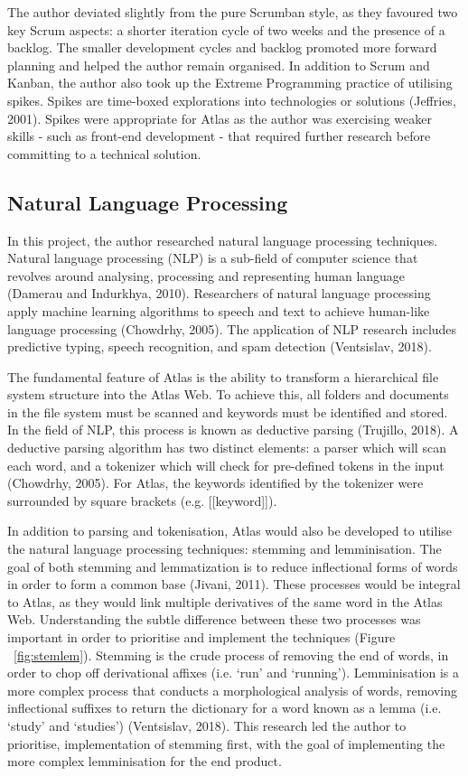 \documentclass{article}
\begin{document}
The author deviated slightly from the pure Scrumban style, as they favoured two key Scrum aspects: a shorter iteration cycle of two weeks and the presence of a backlog. The smaller development cycles and backlog promoted more forward planning and helped the author remain organised. In addition to Scrum and Kanban, the author also took up the Extreme Programming practice of utilising spikes. Spikes are time-boxed explorations into technologies or solutions (Jeffries, 2001). Spikes were appropriate for Atlas as the author was exercising weaker skills - such as front-end development - that required further research before committing to a technical solution.

\subsection{Natural Language Processing}

In this project, the author researched natural language processing techniques. Natural language processing (NLP) is a sub-field of computer science that revolves around analysing, processing and representing human language (Damerau and Indurkhya, 2010). Researchers of natural language processing apply machine learning algorithms to speech and text to achieve human-like language processing (Chowdrhy, 2005). The application of NLP research includes predictive typing, speech recognition, and spam detection (Ventsislav, 2018).

The fundamental feature of Atlas is the ability to transform a hierarchical file system structure into the Atlas Web. To achieve this, all folders and documents in the file system must be scanned and keywords must be identified and stored. In the field of NLP, this process is known as deductive parsing (Trujillo, 2018). A deductive parsing algorithm has two distinct elements: a parser which will scan each word, and a tokenizer which will check for pre-defined tokens in the input (Chowdrhy, 2005). For Atlas, the keywords identified by the tokenizer were surrounded by square brackets (e.g. [[keyword]]).

In addition to parsing and tokenisation, Atlas would also be developed to utilise the natural language processing techniques: stemming and lemminisation. The goal of both stemming and lemmatization is to reduce inflectional forms of words in order to form a common base (Jivani, 2011). These processes would be integral to Atlas, as they would link multiple derivatives of the same word in the Atlas Web. Understanding the subtle difference between these two processes was important in order to prioritise and implement the techniques (Figure ~\ref{fig:stemlem}). Stemming is the crude process of removing the end of words, in order to chop off derivational affixes (i.e. ‘run’ and ‘running’). Lemminisation is a more complex process that conducts a morphological analysis of words, removing inflectional suffixes to return the dictionary for a word known as a lemma (i.e. ‘study’ and ‘studies’) (Ventsislav, 2018). This research led the author to prioritise, implementation of stemming first, with the goal of implementing the more complex lemminisation for the end product.
\end{document}
